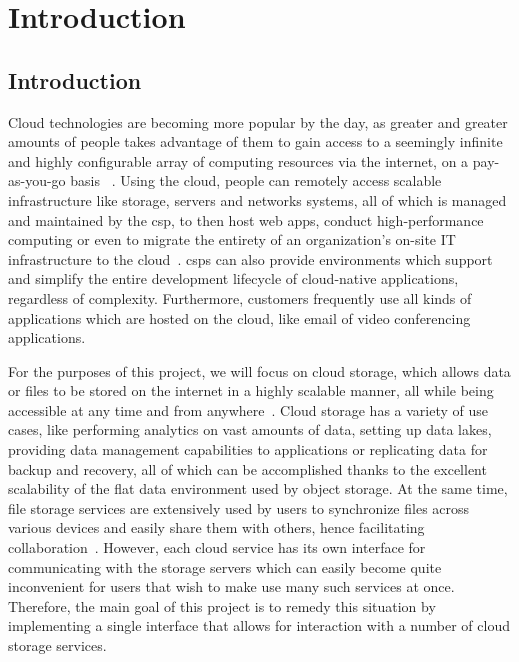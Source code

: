 \tableofcontents

\chapter{Introduction}

\section{Introduction}
Cloud technologies are becoming more popular by the day, as greater and greater amounts of people takes advantage of them to gain access to a seemingly infinite and highly configurable array of computing resources via the internet, on a pay-as-you-go basis ~\cite{gvr}. Using the cloud, people can remotely access scalable infrastructure like storage, servers and networks systems, all of which is managed and maintained by the \ac{csp}, to then host web apps, conduct high-performance computing or even to migrate the entirety of an organization's on-site IT infrastructure to the cloud~\cite{iaas}. \ac{csp}s can also provide environments which support and simplify the entire development lifecycle of cloud-native applications, regardless of complexity. Furthermore, customers frequently use all kinds of applications which are hosted on the cloud, like email of video conferencing applications.

For the purposes of this project, we will focus on cloud storage, which allows data or files to be stored on the internet in a highly scalable manner, all while being accessible at any time and from anywhere~\cite{s3_cloud_storage}. Cloud storage has a variety of use cases, like performing analytics on vast amounts of data, setting up data lakes, providing data management capabilities to applications or replicating data for backup and recovery, all of which can be accomplished thanks to the excellent scalability of the flat data environment used by object storage. At the same time, file storage services are extensively used by users to synchronize files across various devices and easily share them with others, hence facilitating collaboration~\cite{objectvsfile,objectvsfile2}. However, each cloud service has its own interface for communicating with the storage servers which can easily become quite inconvenient for users that wish to make use many such services at once. Therefore, the main goal of this project is to remedy this situation by implementing a single interface that allows for interaction with a number of cloud storage services.

